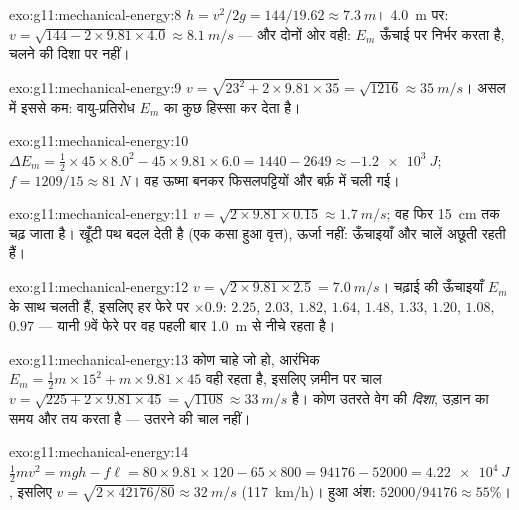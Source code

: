 \begin{solution}{exo:g11:mechanical-energy:8}
$h = v^2/2g = 144/19.62 \approx \qty{7.3}{m}$। \qty{4.0}{m} पर: $v = \sqrt{144 - 2 \times 9.81 \times 4.0} \approx \qty{8.1}{m/s}$ --- और दोनों ओर वही: $E_m$ ऊँचाई पर निर्भर करता
है, चलने की दिशा पर नहीं।
\end{solution}

\begin{solution}{exo:g11:mechanical-energy:9}
$v = \sqrt{23^2 + 2 \times 9.81 \times 35} = \sqrt{1216} \approx
\qty{35}{m/s}$। असल में इससे कम: वायु-प्रतिरोध $E_m$ का कुछ हिस्सा  कर देता है।
\end{solution}

\begin{solution}{exo:g11:mechanical-energy:10}
$\Delta E_m = \tfrac12 \times 45 \times 8.0^2 - 45 \times 9.81 \times
6.0 = 1440 - 2649 \approx \qty{-1.2e3}{J}$; $f = 1209/15 \approx \qty{81}{N}$। वह ऊष्मा बनकर फिसलपट्टियों और बर्फ़ में चली गई।
\end{solution}

\begin{solution}{exo:g11:mechanical-energy:11}
$v = \sqrt{2 \times 9.81 \times 0.15} \approx \qty{1.7}{m/s}$; वह फिर \qty{15}{cm} तक चढ़ जाता है। खूँटी पथ बदल देती है (एक कसा हुआ
वृत्त), ऊर्जा नहीं: ऊँचाइयाँ और चालें अछूती रहती हैं।
\end{solution}

\begin{solution}{exo:g11:mechanical-energy:12}
$v = \sqrt{2 \times 9.81 \times 2.5} = \qty{7.0}{m/s}$। चढ़ाई की ऊँचाइयाँ $E_m$ के साथ चलती हैं, इसलिए हर फेरे पर $\times 0.9$:
$2.25$, $2.03$, $1.82$, $1.64$, $1.48$, $1.33$, $1.20$, $1.08$, $0.97$ ---
यानी $9$वें फेरे पर वह पहली बार \qty{1.0}{m} से नीचे रहता है।
\end{solution}

\begin{solution}{exo:g11:mechanical-energy:13}
कोण चाहे जो हो, आरंभिक $E_m = \tfrac12 m \times 15^2 + m \times 9.81 \times 45$ वही रहता है, इसलिए ज़मीन पर चाल $v = \sqrt{225 + 2 \times 9.81 \times 45} = \sqrt{1108} \approx
\qty{33}{m/s}$ है।
कोण उतरते वेग की \emph{दिशा}, उड़ान का समय और  तय करता है ---
उतरने की चाल नहीं।
\end{solution}

\begin{solution}{exo:g11:mechanical-energy:14}
$\tfrac12 mv^2 = mgh - f\ell = 80 \times 9.81 \times 120 - 65 \times
800 = \num{94176} - \num{52000} = \qty{4.22e4}{J}$, इसलिए $v = \sqrt{2 \times \num{42176}/80} \approx \qty{32}{m/s}$ (\qty{117}{km/h})।  हुआ अंश: $52000/94176 \approx 55\%$।
\end{solution}

